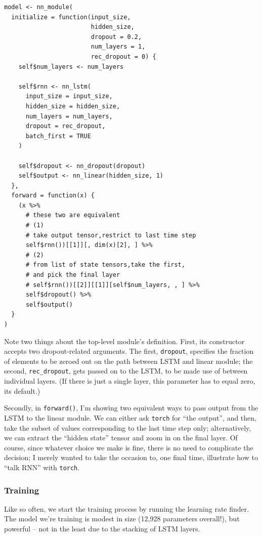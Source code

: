 \documentclass[
  letterpaper,
]{krantz}
\begin{document}
\begin{verbatim}
model <- nn_module(
  initialize = function(input_size,
                        hidden_size,
                        dropout = 0.2,
                        num_layers = 1,
                        rec_dropout = 0) {
    self$num_layers <- num_layers

    self$rnn <- nn_lstm(
      input_size = input_size,
      hidden_size = hidden_size,
      num_layers = num_layers,
      dropout = rec_dropout,
      batch_first = TRUE
    )

    self$dropout <- nn_dropout(dropout)
    self$output <- nn_linear(hidden_size, 1)
  },
  forward = function(x) {
    (x %>%
      # these two are equivalent
      # (1)
      # take output tensor,restrict to last time step
      self$rnn())[[1]][, dim(x)[2], ] %>%
      # (2)
      # from list of state tensors,take the first,
      # and pick the final layer
      # self$rnn())[[2]][[1]][self$num_layers, , ] %>%
      self$dropout() %>%
      self$output()
  }
)
\end{verbatim}

Note two things about the top-level module's definition. First, its
constructor accepts two dropout-related arguments. The first,
\texttt{dropout}, specifies the fraction of elements to be zeroed out on
the path between LSTM and linear module; the second,
\texttt{rec\_dropout}, gets passed on to the LSTM, to be made use of
between individual layers. (If there is just a single layer, this
parameter has to equal zero, its default.)

Secondly, in \texttt{forward()}, I'm showing two equivalent ways to pass
output from the LSTM to the linear module. We can either ask
\texttt{torch} for ``the output'', and then, take the subset of values
corresponding to the last time step only; alternatively, we can extract
the ``hidden state'' tensor and zoom in on the final layer. Of course,
since whatever choice we make is fine, there is no need to complicate
the decision; I merely wanted to take the occasion to, one final time,
illustrate how to ``talk RNN'' with \texttt{torch}.

\hypertarget{training-2}{%
\subsubsection{Training}\label{training-2}}

Like so often, we start the training process by running the learning
rate finder. The model we're training is modest in size (12,928
parameters overall!), but powerful -- not in the least due to the
stacking of LSTM layers.
\end{document}
